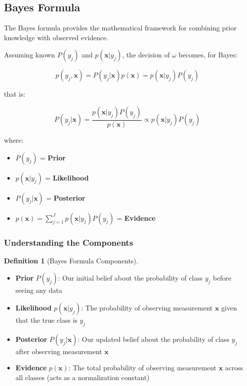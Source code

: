 \documentclass[11pt,a4paper]{article}
\theoremstyle{definition}
\newtheorem{definition}{Definition}[section]
\theoremstyle{plain}
\theoremstyle{remark}
\begin{document}
\subsection{Bayes Formula}

The Bayes formula provides the mathematical framework for combining prior knowledge with observed evidence.

\begin{tcolorbox}[colback=green!5!white,colframe=green!75!black,title=\textbf{Bayes Formula}]
Assuming known $P(y_j)$ and $p(\mathbf{x}|y_j)$, the decision of $\omega$ becomes, for Bayes:

\[
p(y_j, \mathbf{x}) = P(y_j|\mathbf{x})p(\mathbf{x}) = p(\mathbf{x}|y_j)P(y_j)
\]

that is:

\[
P(y_j|\mathbf{x}) = \frac{p(\mathbf{x}|y_j)P(y_j)}{p(\mathbf{x})} \propto p(\mathbf{x}|y_j)P(y_j)
\]

where:
\begin{itemize}
    \item $P(y_j)$ = \textbf{Prior}
    \item $p(\mathbf{x}|y_j)$ = \textbf{Likelihood}
    \item $P(y_j|\mathbf{x})$ = \textbf{Posterior}
    \item $p(\mathbf{x}) = \sum_{j=1}^{J} p(\mathbf{x}|y_j)P(y_j)$ = \textbf{Evidence}
\end{itemize}
\end{tcolorbox}

\subsubsection{Understanding the Components}

\begin{definition}[Bayes Formula Components]
\begin{itemize}
    \item \textbf{Prior} $P(y_j)$: Our initial belief about the probability of class $y_j$ before seeing any data
    
    \item \textbf{Likelihood} $p(\mathbf{x}|y_j)$: The probability of observing measurement $\mathbf{x}$ given that the true class is $y_j$
    
    \item \textbf{Posterior} $P(y_j|\mathbf{x})$: Our updated belief about the probability of class $y_j$ after observing measurement $\mathbf{x}$
    
    \item \textbf{Evidence} $p(\mathbf{x})$: The total probability of observing measurement $\mathbf{x}$ across all classes (acts as a normalization constant)
\end{itemize}
\end{definition}
\end{document}
